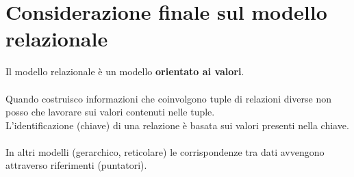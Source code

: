 \section{Considerazione finale sul modello relazionale}
Il modello relazionale è un modello \textbf{orientato ai valori}.\\\\
Quando costruisco informazioni che coinvolgono tuple di relazioni diverse non posso che lavorare sui valori contenuti nelle tuple.\\
L'identificazione (chiave) di una relazione è basata sui valori presenti nella chiave.\\\\
In altri modelli (gerarchico, reticolare) le corrispondenze tra dati avvengono attraverso riferimenti (puntatori).
